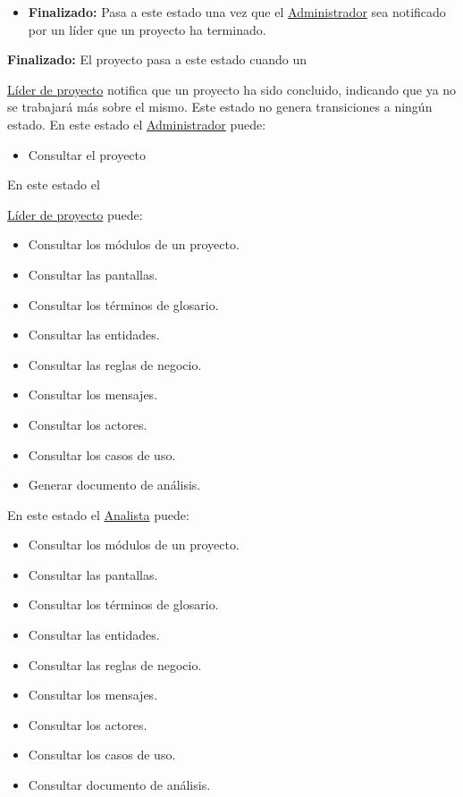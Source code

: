 {{\begin{itemize}
		\item \textbf{Finalizado:} Pasa a este estado una vez que el \hyperlink{admin}{Administrador} sea notificado por un líder que un proyecto ha terminado.
	\end{itemize}	 
	\textbf{Finalizado:} El proyecto pasa a este estado cuando un {\hyperlink{jefe}{Líder de proyecto} notifica que un proyecto ha sido concluido, indicando que ya no se trabajará más sobre el mismo. Este estado no genera transiciones a ningún estado. 
		En este estado el \hyperlink{admin}{Administrador} puede:
		\begin{itemize}
			\item Consultar el proyecto
		\end{itemize}
		En este estado el {\hyperlink{jefe}{Líder de proyecto} puede:
			\begin{itemize}
				\item Consultar los módulos de un proyecto.
				\item Consultar las pantallas.
				\item Consultar los términos de glosario.
				\item Consultar las entidades.
				\item Consultar las reglas de negocio.
				\item Consultar los mensajes.
				\item Consultar los actores.
				\item Consultar los casos de uso.
				\item Generar documento de análisis.
			\end{itemize}
			En este estado el \hyperlink{analista}{Analista} puede:
			\begin{itemize}
				\item Consultar los módulos de un proyecto.
				\item Consultar las pantallas.
				\item Consultar los términos de glosario.
				\item Consultar las entidades.
				\item Consultar las reglas de negocio.
				\item Consultar los mensajes.
				\item Consultar los actores.
				\item Consultar los casos de uso.
				\item Consultar documento de análisis.
			\end{itemize}




}}}}
